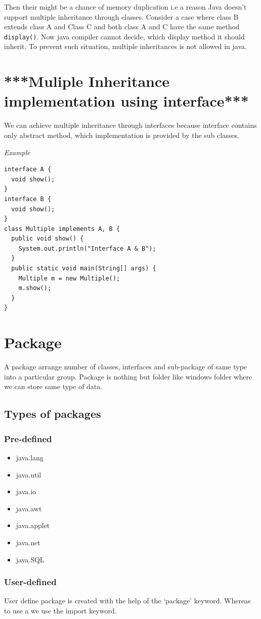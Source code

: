 \documentclass[twocolumn, a4paper]{article}
\begin{document}
Then their might be a chance of memory duplication i.e a reason Java doesn’t
support multiple inheritance through classes.
Consider a case where class B extends class A and Class C and both class A and
C have the same method \verb+display()+.
Now java compiler cannot decide, which display method it should inherit. To
prevent such situation, multiple inheritances is not allowed in java.

\section{***Muliple Inheritance implementation using interface***}
We can achieve multiple inheritance through interfaces because interface
contains only abstract method, which implementation is provided by the sub
classes.

\vskip20pt
\noindent\emph{Example}
\begin{lstlisting}
interface A {
  void show();
}
interface B {
  void show();
}
class Multiple implements A, B {
  public void show() {
    System.out.println("Interface A & B");
  }
  public static void main(String[] args) {
    Multiple m = new Multiple();
    m.show();
  }
}
\end{lstlisting}

\section{Package}
A package arrange number of classes, interfaces and sub-package of same type
into a particular group. Package is nothing but folder like windows folder
where we can store same type of data.
\subsection{Types of packages}
\subsubsection{Pre-defined}
\begin{itemize}
  \item java.lang
  \item java.util
  \item java.io
  \item java.awt
  \item java.applet
  \item java.net
  \item java.SQL
\end{itemize}
\subsubsection{User-defined}
User define package is created with the help of the `package' keyword. Whereas
to use a we use the import keyword.
\end{document}

